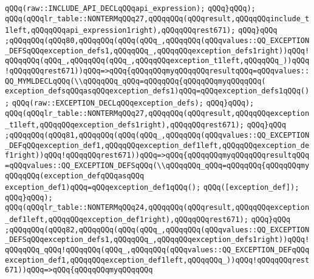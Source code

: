 \verb|qQQq(raw::INCLUDE_API_DECLqQQqapi_expression);|\newline
\verb|qQQq}qQQq);|\newline
\verb|qQQq(qQQqlr_table::NONTERMqQQq27,qQQqqQQq(qQQqresult,qQQqqQQqinclude_t1left,qQQqqQQqapi_expression1right),qQQqqQQqrest671);|\newline
\verb|qQQq}qQQq|\newline
\verb|;qQQqqQQq(qQQq80,qQQqqQQq(qQQq(qQQq_,qQQqqQQq(qQQqvalues::QQ_EXCEPTION_DEFSqQQqexception_defs1,qQQqqQQq_,qQQqqQQqexception_defs1right))qQQq!qQQqqQQq(qQQq_,qQQqqQQq(qQQq_,qQQqqQQqexception_t1left,qQQqqQQq_))qQQq!qQQqqQQqrest671))qQQq=>qQQq{qQQqqQQqmyqQQqqQQqresultqQQq=qQQqvalues::QQ_MYMLDECLqQQq(\\qQQqqQQq_qQQq=qQQqqQQq{qQQqqQQqmyqQQqqQQq(|\newline
\verb|exception_defsqQQqasqQQqexception_defs1)qQQq=qQQqexception_defs1qQQq();|\newline
\verb|qQQq(raw::EXCEPTION_DECLqQQqexception_defs);|\newline
\verb|qQQq}qQQq);|\newline
\verb|qQQq(qQQqlr_table::NONTERMqQQq27,qQQqqQQq(qQQqresult,qQQqqQQqexception_t1left,qQQqqQQqexception_defs1right),qQQqqQQqrest671);|\newline
\verb|qQQq}qQQq|\newline
\verb|;qQQqqQQq(qQQq81,qQQqqQQq(qQQq(qQQq_,qQQqqQQq(qQQqvalues::QQ_EXCEPTION_DEFqQQqexception_def1,qQQqqQQqexception_def1left,qQQqqQQqexception_def1right))qQQq!qQQqqQQqrest671))qQQq=>qQQq{qQQqqQQqmyqQQqqQQqresultqQQq=qQQqvalues::QQ_EXCEPTION_DEFSqQQq(\\qQQqqQQq_qQQq=qQQqqQQq{qQQqqQQqmyqQQqqQQq(exception_defqQQqasqQQq|\newline
\verb|exception_def1)qQQq=qQQqexception_def1qQQq();|\newline
\verb|qQQq([exception_def]);|\newline
\verb|qQQq}qQQq);|\newline
\verb|qQQq(qQQqlr_table::NONTERMqQQq24,qQQqqQQq(qQQqresult,qQQqqQQqexception_def1left,qQQqqQQqexception_def1right),qQQqqQQqrest671);|\newline
\verb|qQQq}qQQq|\newline
\verb|;qQQqqQQq(qQQq82,qQQqqQQq(qQQq(qQQq_,qQQqqQQq(qQQqvalues::QQ_EXCEPTION_DEFSqQQqexception_defs1,qQQqqQQq_,qQQqqQQqexception_defs1right))qQQq!qQQqqQQq_qQQq!qQQqqQQq(qQQq_,qQQqqQQq(qQQqvalues::QQ_EXCEPTION_DEFqQQqexception_def1,qQQqqQQqexception_def1left,qQQqqQQq_))qQQq!qQQqqQQqrest671))qQQq=>qQQq{qQQqqQQqmyqQQqqQQq|\newline
